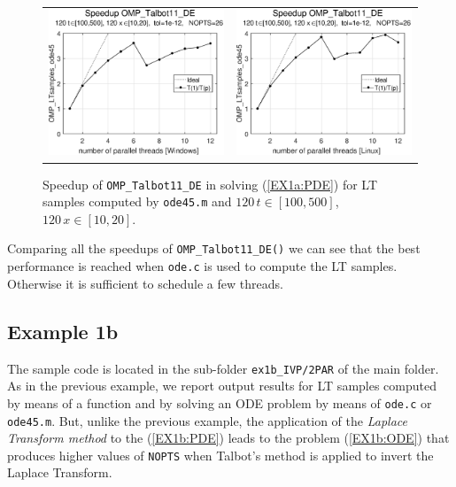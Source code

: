 \documentclass[a4paper,10pt]{report}%
\begin{document}
\begin{figure}[htb]
\centering
\begin{tabular}{cc}
\includegraphics[height=0.2\textwidth]{./FIGS/EX1a/EX1a_ode45_speedup_11_Windows.eps} &
\includegraphics[height=0.2\textwidth]{./FIGS/EX1a/EX1a_ode45_speedup_11_Linux.eps}
\end{tabular}
\caption{\small Speedup of {\tt OMP\_Talbot11\_DE} in solving (\ref{EX1a:PDE}) for LT samples computed
by {\tt ode45.m} and $120\,t\in[100,500]$, $120\,x\in[10,20]$.}
\label{PAR_EX1a_speedup_ode45}
\end{figure}

\noindent Comparing all the speedups of {\tt OMP\_Talbot11\_DE()} we can see that the best
performance is reached when {\tt ode.c} is used to compute the LT samples.
Otherwise it is sufficient to schedule a few threads.



\subsection{Example 1b}\label{PAR_EX1b}
The sample code is located in the sub-folder {\tt ex1b\_IVP/2PAR} of the main folder.
\\
As in the previous example, we report output results for LT samples computed by means of a function and by solving
an ODE problem by means of {\tt ode.c} or {\tt ode45.m}. But, unlike the previous example, the application of the
{\em Laplace Transform method} to the (\ref{EX1b:PDE}) leads to the problem (\ref{EX1b:ODE}) that produces higher
values of {\tt NOPTS} when Talbot's method is applied to invert the Laplace Transform.
\end{document}
